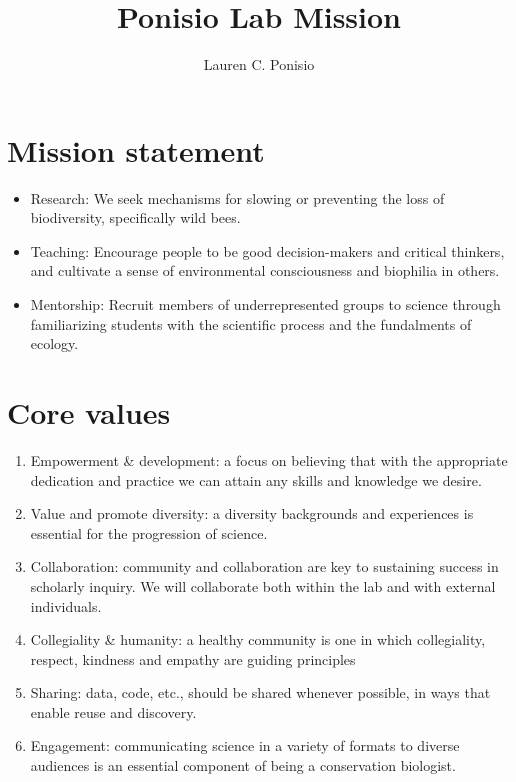 \documentclass[12pt]{article}
\title{Ponisio Lab Mission}
\author{Lauren C. Ponisio}
\begin{document}
\maketitle

\section{Mission statement}
\begin{itemize}
\item Research: We seek mechanisms for slowing or preventing the loss
  of biodiversity, specifically wild bees. 
\item Teaching: Encourage people to be good decision-makers
and critical thinkers, and cultivate a sense of environmental
consciousness and biophilia in others.
\item Mentorship: Recruit members of underrepresented groups to
  science through familiarizing students with the scientific process
  and the fundalments of ecology.
\end{itemize}

\section{Core values}

\begin{enumerate}
\item Empowerment \& development: a focus on believing that with the
  appropriate dedication and practice we can attain any skills and
  knowledge we desire.
\item Value and promote diversity: a diversity backgrounds and experiences is essential
  for the progression of science.
\item Collaboration: community and collaboration are key to sustaining
  success in scholarly inquiry. We will collaborate both within the
  lab and with external individuals.
\item Collegiality \& humanity: a healthy community is one in which
  collegiality, respect, kindness and empathy are guiding principles
\item Sharing: data, code, etc., should be shared whenever possible,
  in ways that enable reuse and discovery.
\item Engagement: communicating science in a variety of formats to
  diverse audiences is an essential component of being a conservation
  biologist.
\end{enumerate}
\end{document}
